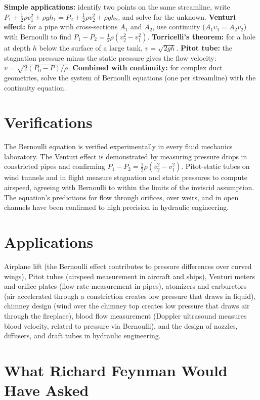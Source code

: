 \documentclass[11pt,openright]{book}
\begin{document}
\textbf{Simple applications:} identify two points on the same streamline, write $P_1 + \frac{1}{2}\rho v_1^2 + \rho gh_1 = P_2 + \frac{1}{2}\rho v_2^2 + \rho gh_2$, and solve for the unknown. \textbf{Venturi effect:} for a pipe with cross-sections $A_1$ and $A_2$, use continuity ($A_1 v_1 = A_2 v_2$) with Bernoulli to find $P_1 - P_2 = \frac{1}{2}\rho(v_2^2 - v_1^2)$. \textbf{Torricelli's theorem:} for a hole at depth $h$ below the surface of a large tank, $v = \sqrt{2gh}$. \textbf{Pitot tube:} the stagnation pressure minus the static pressure gives the flow velocity: $v = \sqrt{2(P_0 - P)/\rho}$. \textbf{Combined with continuity:} for complex duct geometries, solve the system of Bernoulli equations (one per streamline) with the continuity equation.
\section*{Verifications}

The Bernoulli equation is verified experimentally in every fluid mechanics laboratory. The Venturi effect is demonstrated by measuring pressure drops in constricted pipes and confirming $P_1 - P_2 = \frac{1}{2}\rho(v_2^2 - v_1^2)$. Pitot-static tubes on wind tunnels and in flight measure stagnation and static pressures to compute airspeed, agreeing with Bernoulli to within the limits of the inviscid assumption. The equation's predictions for flow through orifices, over weirs, and in open channels have been confirmed to high precision in hydraulic engineering.
\section*{Applications}

Airplane lift (the Bernoulli effect contributes to pressure differences over curved wings), Pitot tubes (airspeed measurement in aircraft and ships), Venturi meters and orifice plates (flow rate measurement in pipes), atomizers and carburetors (air accelerated through a constriction creates low pressure that draws in liquid), chimney design (wind over the chimney top creates low pressure that draws air through the fireplace), blood flow measurement (Doppler ultrasound measures blood velocity, related to pressure via Bernoulli), and the design of nozzles, diffusers, and draft tubes in hydraulic engineering.
\section*{What Richard Feynman Would Have Asked}
\end{document}
